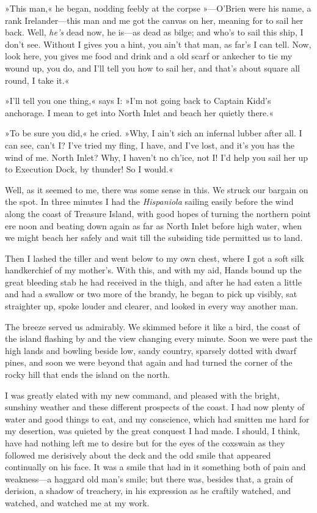 »This man,« he began, nodding feebly at the corpse »—O'Brien were his name, a rank Irelander—this man and me got the canvas on her, meaning for to sail her back. Well, \textit{he's} dead now, he is—as dead as bilge; and who's to sail this ship, I don't see. Without I gives you a hint, you ain't that man, as far's I can tell. Now, look here, you gives me food and drink and a old scarf or ankecher to tie my wound up, you do, and I'll tell you how to sail her, and that's about square all round, I take it.«

»I'll tell you one thing,« says I: »I'm not going back to Captain Kidd's anchorage. I mean to get into North Inlet and beach her quietly there.«

»To be sure you did,« he cried. »Why, I ain't sich an infernal lubber after all. I can see, can't I? I've tried my fling, I have, and I've lost, and it's you has the wind of me. North Inlet? Why, I haven't no ch'ice, not I! I'd help you sail her up to Execution Dock, by thunder! So I would.«

Well, as it seemed to me, there was some sense in this. We struck our bargain on the spot. In three minutes I had the \textit{Hispaniola} sailing easily before the wind along the coast of Treasure Island, with good hopes of turning the northern point ere noon and beating down again as far as North Inlet before high water, when we might beach her safely and wait till the subsiding tide permitted us to land.

Then I lashed the tiller and went below to my own chest, where I got a soft silk handkerchief of my mother's. With this, and with my aid, Hands bound up the great bleeding stab he had received in the thigh, and after he had eaten a little and had a swallow or two more of the brandy, he began to pick up visibly, sat straighter up, spoke louder and clearer, and looked in every way another man.

The breeze served us admirably. We skimmed before it like a bird, the coast of the island flashing by and the view changing every minute. Soon we were past the high lands and bowling beside low, sandy country, sparsely dotted with dwarf pines, and soon we were beyond that again and had turned the corner of the rocky hill that ends the island on the north.

I was greatly elated with my new command, and pleased with the bright, sunshiny weather and these different prospects of the coast. I had now plenty of water and good things to eat, and my conscience, which had smitten me hard for my desertion, was quieted by the great conquest I had made. I should, I think, have had nothing left me to desire but for the eyes of the coxswain as they followed me derisively about the deck and the odd smile that appeared continually on his face. It was a smile that had in it something both of pain and weakness—a haggard old man's smile; but there was, besides that, a grain of derision, a shadow of treachery, in his expression as he craftily watched, and watched, and watched me at my work.